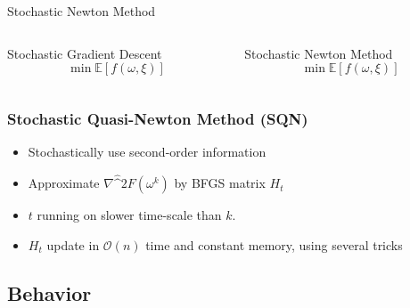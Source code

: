 \documentclass[10pt]{beamer}
\begin{document}
 
  \begin{frame}{Stochastic Newton Method}
    \begin{columns}[T]
      \begin{column}{.5\textwidth}
        \centering \alert{Stochastic Gradient Descent}
        $$\min \mathbb E \left [f(\omega, \xi)\right]$$
      \end{column}\hfill
      \begin{column}{.5\textwidth}
        \centering \alert{Stochastic Newton Method}
        $$\min \mathbb E \left [f(\omega, \xi)\right]$$
      \end{column}
    \end{columns}
  \end{frame}
  
  \begin{frame}\frametitle{Stochastic Quasi-Newton Method (SQN)}
      \begin{itemize}
        \item \alert{Stochastically} use second-order information
        \item Approximate $\nabla \hat^2 F(\omega^{k})$ by BFGS matrix $H_t$
        \item $t$ running on slower time-scale than $k$. 
        \item $H_t$ update in $\mathcal O(n)$ time and constant memory, using several tricks
      \end{itemize}
  \end{frame}

  \subsection*{Behavior}
\end{document}
